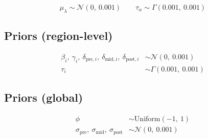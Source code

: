 \documentclass{article}
\begin{document}
\begin{equation}
  \mu_\lambda \sim \mathcal{N}(0,\ 0.001) \qquad \tau_\alpha \sim \Gamma(0.001,\ 0.001)
\end{equation}

\subsection*{Priors (region-level)}

\begin{align}
  \beta_i,\ \gamma_i,\ \delta_{\text{pre},i},\ \delta_{\text{mid},i},\ \delta_{\text{post},i} &\sim \mathcal{N}(0,\ 0.001) \\
  \tau_i &\sim \Gamma(0.001,\ 0.001)
\end{align}

\subsection*{Priors (global)}

\begin{align}
  \phi &\sim \mathrm{Uniform}(-1,\ 1) \\
  \sigma_{\text{pre}},\ \sigma_{\text{mid}},\ \sigma_{\text{post}} &\sim \mathcal{N}(0,\ 0.001)
\end{align}
\end{document}
